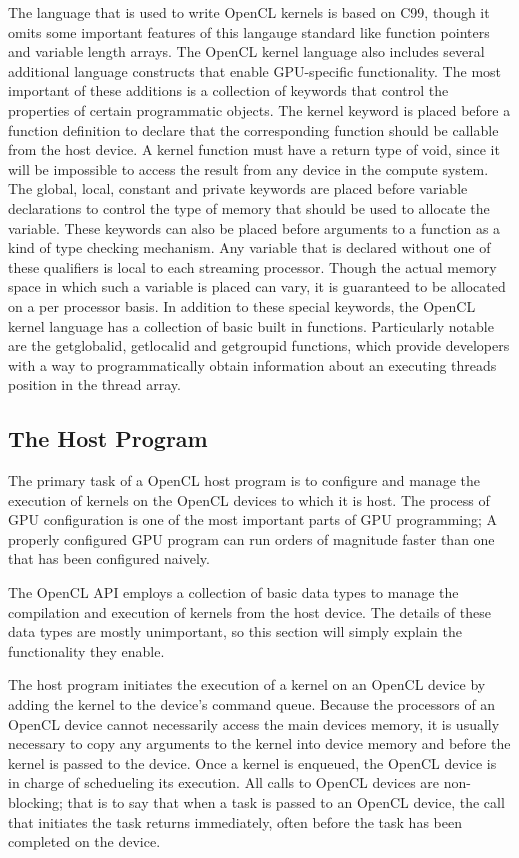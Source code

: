 \documentclass[12pt,twoside]{reedthesis}
\begin{document}
The language that is used to write OpenCL kernels is based on C99, though it omits some important features of this langauge standard like function pointers and variable length arrays. The OpenCL kernel language also includes several additional language constructs that enable GPU-specific functionality. The most important of these additions is a collection of keywords that control the properties of certain programmatic objects.
The kernel keyword is placed before a function definition to declare that the corresponding function should be callable from the host device. A kernel function must have a return type of void, since it will be impossible to access the result from any device in the compute system.
The global, local, constant and private keywords are placed before variable declarations to control the type of memory that should be used to allocate the variable. These keywords can also be placed before arguments to a function as a kind of type checking mechanism. Any variable that is declared without one of these qualifiers is local to each streaming processor. Though the actual memory space in which such a variable is placed can vary, it is guaranteed to be allocated on a per processor basis.
In addition to these special keywords, the OpenCL kernel language has a collection of basic built in functions. Particularly notable are the getglobalid, getlocalid and getgroupid functions, which provide developers with a way to programmatically obtain information about an executing threads position in the thread array.

\subsection{The Host Program}

The primary task of a OpenCL host program is to configure and manage the execution of kernels on the OpenCL devices to which it is host. The process of GPU configuration is one of the most important parts of GPU programming; A properly configured GPU program can run orders of magnitude faster than one that has been configured naively.

The OpenCL API employs a collection of basic data types to manage the compilation and execution of kernels from the host device. The details of these data types are mostly unimportant, so this section will simply explain the functionality they enable.

The host program initiates the execution of a kernel on an OpenCL device by adding the kernel to the device's command queue. Because the processors of an OpenCL device cannot necessarily access the main devices memory, it is usually necessary to copy any arguments to the kernel into device memory and before the kernel is passed to the device. Once a kernel is enqueued, the OpenCL device is in charge of schedueling its execution. All calls to OpenCL devices are non-blocking; that is to say that when a task is passed to an OpenCL device, the call that initiates the task returns immediately, often before the task has been completed on the device. 
\end{document}
